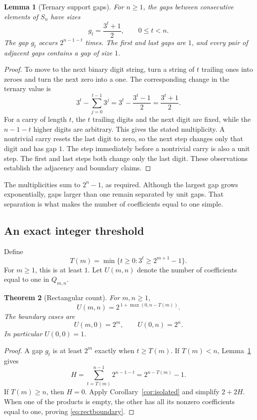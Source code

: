 \documentclass[11pt,letterpaper]{article}
\numberwithin{equation}{section}
\newtheorem{theorem}{Theorem}[section]
\newtheorem{lemma}[theorem]{Lemma}
\theoremstyle{definition}
\theoremstyle{remark}
\begin{document}
\begin{lemma}[Ternary support gaps]\label{lem:ternarygaps}
For $n\ge1$, the gaps between consecutive elements of $S_n$ have sizes
\begin{equation}\label{eq:ternarygap}
 g_t=\frac{3^t+1}{2},\qquad 0\le t<n.
\end{equation}
The gap $g_t$ occurs $2^{n-1-t}$ times. The first and last gaps are $1$,
and every pair of adjacent gaps contains a gap of size $1$.
\end{lemma}
\begin{proof}
To move to the next binary digit string, turn a string of $t$ trailing ones
into zeroes and turn the next zero into a one. The corresponding change in
the ternary value is
\[
 3^t-\sum_{j=0}^{t-1}3^j
 =3^t-\frac{3^t-1}{2}=\frac{3^t+1}{2}.
\]
For a carry of length $t$, the $t$ trailing digits and the next digit are
fixed, while the $n-1-t$ higher digits are arbitrary. This gives the stated
multiplicity. A nontrivial carry resets the last digit to zero, so the next
step changes only that digit and has gap $1$. The step immediately before
a nontrivial carry is also a unit step. The first and last steps both change
only the last digit. These observations establish the adjacency and boundary
claims.
\end{proof}

The multiplicities sum to $2^n-1$, as required. Although the largest gap
grows exponentially, gaps larger than one remain separated by unit gaps.
That separation is what makes the number of coefficients equal to one simple.

\subsection{An exact integer threshold}
Define
\begin{equation}\label{eq:threshold}
 T(m)=\min\{t\ge0:3^t\ge 2^{m+1}-1\}.
\end{equation}
For $m\ge1$, this is at least $1$. Let $U(m,n)$ denote the number of
coefficients equal to one in $Q_{m,n}$.

\begin{theorem}[Rectangular count]\label{thm:rectangle}
For $m,n\ge1$,
\begin{equation}\label{eq:rectcount}
 U(m,n)=2^{\,1+\max(0,n-T(m))}.
\end{equation}
The boundary cases are
\begin{equation}\label{eq:rectboundary}
 U(m,0)=2^m,\qquad U(0,n)=2^n.
\end{equation}
In particular $U(0,0)=1$.
\end{theorem}
\begin{proof}
A gap $g_t$ is at least $2^m$ exactly when $t\ge T(m)$. If $T(m)<n$,
Lemma~\ref{lem:ternarygaps} gives
\[
 H=\sum_{t=T(m)}^{n-1}2^{n-1-t}=2^{n-T(m)}-1.
\]
If $T(m)\ge n$, then $H=0$. Apply Corollary~\ref{cor:isolated} and simplify
$2+2H$. When one of the products is empty, the other has all its nonzero
coefficients equal to one, proving \eqref{eq:rectboundary}.
\end{proof}
\end{document}

